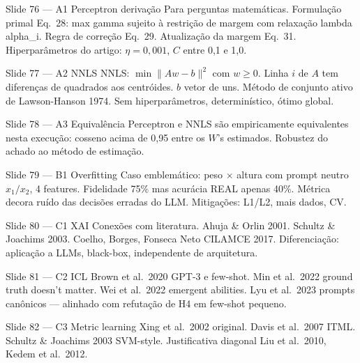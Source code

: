 \documentclass[aspectratio=169,10pt]{beamer}
\begin{document}
\begin{frame}{Slide 76 --- A1 Perceptron deriva\c{c}\~ao}
\footnotesize
Para perguntas matem\'aticas. Formula\c{c}\~ao primal Eq.\ 28: max gamma sujeito \`a restri\c{c}\~ao de margem com relaxa\c{c}\~ao lambda alpha\_i. Regra de corre\c{c}\~ao Eq.\ 29. Atualiza\c{c}\~ao da margem Eq.\ 31. Hiperpar\^ametros do artigo: $\eta = 0{,}001$, $C$ entre 0{,}1 e 1{,}0.
\end{frame}

\begin{frame}{Slide 77 --- A2 NNLS}
\footnotesize
NNLS: $\min \|Aw - b\|^2$ com $w \geq 0$. Linha $i$ de $A$ tem diferen\c{c}as de quadrados aos centr\'oides. $b$ vetor de uns. M\'etodo de conjunto ativo de Lawson-Hanson 1974. Sem hiperpar\^ametros, determin\'istico, \'otimo global.
\end{frame}

\begin{frame}{Slide 78 --- A3 Equival\^encia}
\footnotesize
Perceptron e NNLS s\~ao empiricamente equivalentes nesta execu\c{c}\~ao: cosseno acima de 0{,}95 entre os $W$'s estimados. Robustez do achado ao m\'etodo de estima\c{c}\~ao.
\end{frame}

\begin{frame}{Slide 79 --- B1 Overfitting}
\footnotesize
Caso emblem\'atico: peso $\times$ altura com prompt neutro $x_1/x_2$, 4 features. Fidelidade 75\% mas acur\'acia REAL apenas 40\%. M\'etrica decora ru\'ido das decis\~oes erradas do LLM. Mitiga\c{c}\~oes: L1/L2, mais dados, CV.
\end{frame}

\begin{frame}{Slide 80 --- C1 XAI}
\footnotesize
Conex\~oes com literatura. Ahuja \& Orlin 2001. Schultz \& Joachims 2003. Coelho, Borges, Fonseca Neto CILAMCE 2017. Diferencia\c{c}\~ao: aplica\c{c}\~ao a LLMs, black-box, independente de arquitetura.
\end{frame}

\begin{frame}{Slide 81 --- C2 ICL}
\footnotesize
Brown et al.\ 2020 GPT-3 e few-shot. Min et al.\ 2022 ground truth doesn't matter. Wei et al.\ 2022 emergent abilities. Lyu et al.\ 2023 prompts can\^onicos --- alinhado com refuta\c{c}\~ao de H4 em few-shot pequeno.
\end{frame}

\begin{frame}{Slide 82 --- C3 Metric learning}
\footnotesize
Xing et al.\ 2002 original. Davis et al.\ 2007 ITML. Schultz \& Joachims 2003 SVM-style. Justificativa diagonal Liu et al.\ 2010, Kedem et al.\ 2012.
\end{frame}
\end{document}
